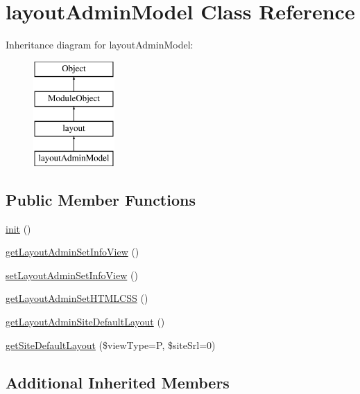 \hypertarget{classlayoutAdminModel}{}\section{layout\+Admin\+Model Class Reference}
\label{classlayoutAdminModel}
Inheritance diagram for layout\+Admin\+Model\+:\begin{figure}[H]
\begin{center}
\leavevmode
\includegraphics[height=4.000000cm]{classlayoutAdminModel}
\end{center}
\end{figure}
\subsection*{Public Member Functions}
\begin{DoxyCompactItemize}
\item 
\hyperlink{classlayoutAdminModel_aeb0c45993a600a2e3f72bd0a79c3adc7}{init} ()
\item 
\hyperlink{classlayoutAdminModel_a7171578a8c44846e96b6330378152ddd}{get\+Layout\+Admin\+Set\+Info\+View} ()
\item 
\hyperlink{classlayoutAdminModel_a5d53a19d62ff5fcbd2cc604e3d6a8e29}{set\+Layout\+Admin\+Set\+Info\+View} ()
\item 
\hyperlink{classlayoutAdminModel_a5757eaff4093fe8a359b4f3b5a6a2bff}{get\+Layout\+Admin\+Set\+H\+T\+M\+L\+C\+SS} ()
\item 
\hyperlink{classlayoutAdminModel_a1fb703fe8ebe3ced1f904d3a1d645532}{get\+Layout\+Admin\+Site\+Default\+Layout} ()
\item 
\hyperlink{classlayoutAdminModel_a2b457349c237f1db4a9d66449ebff4cb}{get\+Site\+Default\+Layout} (\$view\+Type=\textquotesingle{}P\textquotesingle{}, \$site\+Srl=0)
\end{DoxyCompactItemize}
\subsection*{Additional Inherited Members}



